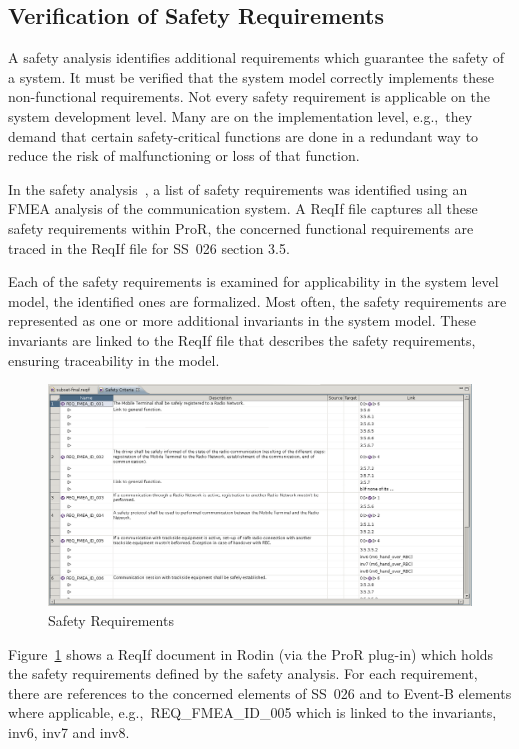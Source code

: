 \documentclass{article}
\begin{document}
\subsection{Verification of Safety Requirements}
\label{sec:verif-safety-requ}

A safety analysis identifies additional requirements which guarantee the safety
of a system. It must be verified that the system model correctly implements
these non-functional requirements. Not every safety requirement is applicable on
the system development level. Many are on the implementation level, e.g.,\ they
demand that certain safety-critical functions are done in a redundant way to
reduce the risk of malfunctioning or loss of that function.

In the safety analysis~\cite{safetyBrice}, a list of safety requirements was
identified using an FMEA analysis of the communication system. A ReqIf file
captures all these safety requirements within ProR, the concerned functional
requirements are traced in the ReqIf file for SS~026 section 3.5.

Each of the safety requirements is examined for applicability in the system
level model, the identified ones are formalized. Most often, the safety
requirements are represented as one or more additional invariants in the system
model. These invariants are linked to the ReqIf file that describes the safety
requirements, ensuring traceability in the model.

\begin{figure}[ht]
  \centering
  \includegraphics[width=1\textwidth]{pictures/ProRSafetyReq}
  \caption{Safety Requirements}
  \label{fig:pror-safety-req}
\end{figure}

Figure~\ref{fig:pror-safety-req} shows a ReqIf document in Rodin (via the ProR
plug-in) which holds the safety requirements defined by the safety analysis. For
each requirement, there are references to the concerned elements of SS~026 and
to Event-B elements where applicable, e.g.,\ {\sf REQ\_FMEA\_ID\_005} which is
linked to the invariants, {\sf inv6}, {\sf inv7} and {\sf inv8}.
\end{document}
